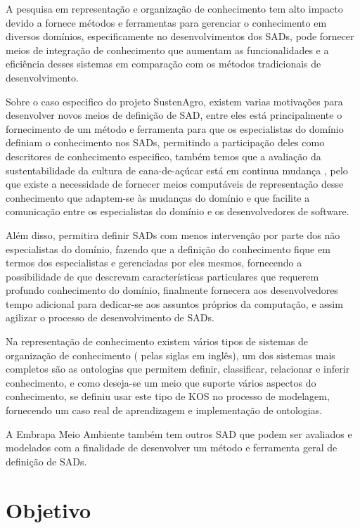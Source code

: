 A pesquisa em representação e organização de conhecimento tem alto
impacto devido a fornece métodos e ferramentas para gerenciar o conhecimento
em diversos domínios, especificamente no desenvolvimentos dos SADs,
pode fornecer meios de integração de conhecimento que aumentam as
funcionalidades e a eficiência desses sistemas em comparação com os
métodos tradicionais de desenvolvimento.

Sobre o caso especifico do projeto SustenAgro, existem varias motivações
para desenvolver novos meios de definição de SAD, entre eles está
principalmente o fornecimento de um método e ferramenta para que os
especialistas do domínio definiam o conhecimento nos SADs, permitindo
a participação deles como descritores de conhecimento especifico,
também temos que a avaliação da sustentabilidade da cultura de cana-de-açúcar
está em continua mudança \citep{oliveira:2013}, pelo que existe a
necessidade de fornecer meios computáveis de representação desse conhecimento
que adaptem-se às mudanças do domínio e que facilite a comunicação
entre os especialistas do domínio e os desenvolvedores de software.

Além disso, permitira definir SADs com menos intervenção por parte
dos não especialistas do domínio, fazendo que a definição do conhecimento
fique em termos dos especialistas e gerenciadas por eles mesmos, fornecendo
a possibilidade de que descrevam características particulares que
requerem profundo conhecimento do domínio, finalmente fornecera aos
desenvolvedores tempo adicional para dedicar-se aos assuntos próprios
da computação, e assim agilizar o processo de desenvolvimento de SADs.

Na representação de conhecimento existem vários tipos de sistemas
de organização de conhecimento (
pelas siglas em inglês), um dos sistemas mais completos são as ontologias
que permitem definir, classificar, relacionar e inferir conhecimento,
e como deseja-se um meio que suporte vários aspectos do conhecimento,
se definiu usar este tipo de \foreignlanguage{english}{KOS} no processo
de modelagem, fornecendo um caso real de aprendizagem e implementação
de ontologias.

A Embrapa Meio Ambiente também tem outros SAD que podem ser avaliados
e modelados com a finalidade de desenvolver um método e ferramenta
geral de definição de SADs.

\section{Objetivo}

